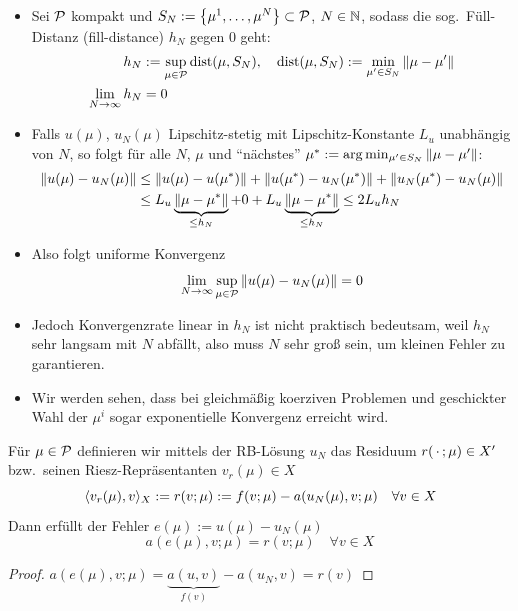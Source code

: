 \begin{bem} \beginwithlistbem
	\begin{itemize}
		\item Sei $\mathcal{P}$ kompakt und $S_N := \left\{\mu^1,\dots,\mu^N\right\} \subset \mathcal{P}$, $N \in \mathbb{N}$, sodass die sog.\ Füll-Distanz (fill-distance) $h_N$ gegen 0 geht:
			\begin{align*}
				h_N &:= \sup_{\mu \in \mathcal{P}} \operatorname{dist}(\mu, S_N), \quad \operatorname{dist}(\mu,S_N) := \min_{\mu' \in S_N} \|\mu - \mu'\|\\
				\lim_{N \to \infty} h_N &= 0
			\end{align*}
		\item Falls $u(\mu)$, $u_N(\mu)$ Lipschitz-stetig mit Lipschitz-Konstante $L_u$ unabhängig von $N$, so folgt für alle $N$, $\mu$ und ``nächstes'' $\mu^* := \arg\min_{\mu' \in S_N} \|\mu-\mu'\|$:
			\begin{align*}
				\|u(\mu)-u_N(\mu)\| &\leq \|u(\mu)-u(\mu^*)\| + \|u(\mu^*)-u_N(\mu^*)\| + \|u_N(\mu^*)-u_N(\mu)\|\\
				&\leq L_u \underbrace{\|\mu-\mu^*\|}_{\leq h_N} + 0 + L_u \underbrace{\|\mu - \mu^*\|}_{\leq h_N} \leq 2 L_u h_N
			\end{align*}
		\item Also folgt uniforme Konvergenz
			\[
				\lim_{N \to \infty} \sup_{\mu \in \mathcal{P}} \|u(\mu)-u_N(\mu)\| = 0
			\]
			\item Jedoch Konvergenzrate linear in $h_N$ ist nicht praktisch bedeutsam, weil $h_N$ sehr langsam mit $N$ abfällt, also muss $N$ sehr groß sein, um kleinen Fehler zu garantieren.
			\item Wir werden sehen, dass bei gleichmäßig koerziven Problemen und geschickter Wahl der $\mu^i$ sogar exponentielle Konvergenz erreicht wird.
	\end{itemize}
\end{bem}

\begin{lemma} \label{3.12}
	Für $\mu \in \mathcal{P}$ definieren wir mittels der RB-Lösung $u_N$ das Residuum $r(\,\cdot\,;\mu) \in X'$ bzw.\ seinen Riesz-Repräsentanten $v_r(\mu) \in X$
	\[
		\langle v_r(\mu), v \rangle_X := r(v;\mu) := f(v;\mu) - a(u_N(\mu),v;\mu) \quad \forall v \in X
	\]
	Dann erfüllt der Fehler $e(\mu) := u(\mu)-u_N(\mu)$
	\[
		a(e(\mu),v;\mu) = r(v;\mu) \quad \forall v \in X
	\]

	\begin{proof}
		$a(e(\mu),v;\mu) = \underbrace{a(u,v)}_{f(v)} - a(u_N,v) = r(v)$
	\end{proof}
\end{lemma}

